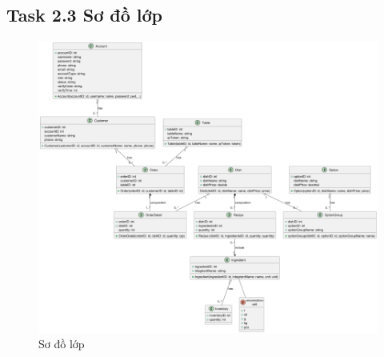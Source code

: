 \documentclass[a4paper]{article}
\begin{document}
\subsection{Task 2.3 Sơ đồ lớp}
    \begin{figure}[H]
        \centering
        \includegraphics[width=1.0\textwidth]{task23.png}
        \caption{Sơ đồ lớp}
    \end{figure}
\end{document}

